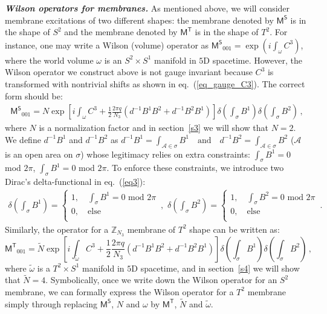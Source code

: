 \documentclass[11pt,nofootinbib,preprint]{revtex4-1}
\begin{document}
\textbf{\textit{Wilson operators for membranes.}}
As mentioned above, we will consider   membrane excitations of two different shapes: the membrane denoted by $\mathsf{M^S}$ is in the shape of $S^2$ and the membrane denoted by $\mathsf{M^T}$ is in the shape of $T^2$. For instance, one may write a Wilson (volume) operator as $
	\mathsf{M^S}_{001}=\exp \left( i\int_{\omega}{C^3} \right)$,  where the world volume $\omega$ is an $S^2\times S^1$ manifold in $5$D spacetime. However, the Wilson operator we construct above is not gauge invariant because $C^3$ is transformed with nontrivial shifts as shown in eq.~(\ref{eq_gauge_C3}). The correct form should be:
\begin{align}
	\mathsf{M^S}_{001}=N\exp \left[ i\int_{\omega}{C^3+\frac{1}{2}\frac{2\pi q}{N_3}\left( d^{-1}B^1B^2+d^{-1}B^2B^1 \right)} \right] \delta \left( \int_{\sigma}{B^1} \right) \delta \left( \int_{\sigma}{B^2} \right) \,,
	\label{eq3}
\end{align}
where $N$ is a normalization factor and in section~\ref{s3} we will show that $N=2$. We define $d^{-1}B^1$ and $d^{-1}B^2$ as
$	d^{-1}B^1=\int_{\mathcal{A} \in \sigma}{B^1} \quad\text{and}\quad d^{-1}B^2=\int_{\mathcal{A} \in \sigma}{B^2}
 $ ($\mathcal{A}$ is an open area on $\sigma$) whose legitimacy relies on  extra constraints:  $\int_{\sigma}{B^1}=0$ mod $2\pi$, $\int_{\sigma}{B^1}=0$ mod $2\pi$. To enforce these constraints, we introduce two Dirac's delta-functional in eq.~(\ref{eq3}):
\begin{align}
	\delta \left( \int_{\sigma}{B^1} \right) =\begin{cases}
		1, \quad \int_{\sigma}{B^1}=0   \,\, \mathrm{mod}\,\, 2\pi\\
		0, \quad \mathrm{else}\\
	\end{cases}\,,\,\,
	\delta \left( \int_{\sigma}{B^2} \right) =\begin{cases}
		1, \quad \int_{\sigma}{B^2}=0 \,\,  \mathrm{mod} \,\, 2\pi\\
		0, \quad \mathrm{else}\\
	\end{cases}\,.
\end{align}
Similarly, the operator for  a $\mathbb{Z} _{N_3}$ membrane of $T^2$ shape can be written as:
\begin{equation}
	\mathsf{M^T}_{001}=\tilde{N}\exp \left[ i\int_{\tilde{\omega}}{C^3+\frac{1}{2}\frac{2\pi q}{N_3}\left( d^{-1}B^1B^2+d^{-1}B^2B^1 \right)} \right] \delta \left( \int_{\sigma}{B^1} \right) \delta \left( \int_{\sigma}{B^2} \right) \,,
\end{equation}
where $\tilde{\omega}$ is a $T^2\times S^1$ manifold in $5$D spacetime, and in section~\ref{s4} we will show that  $\tilde{N}=4$. Symbolically, once we write down the Wilson operator for an $S^2$ membrane, we can formally express  the Wilson operator for a $T^2$ membrane  simply through replacing $\mathsf{M^S}$, $N$ and $\omega$ by $\mathsf{M^T}$, $\tilde{N}$ and $\tilde{\omega}$. 
\end{document}
